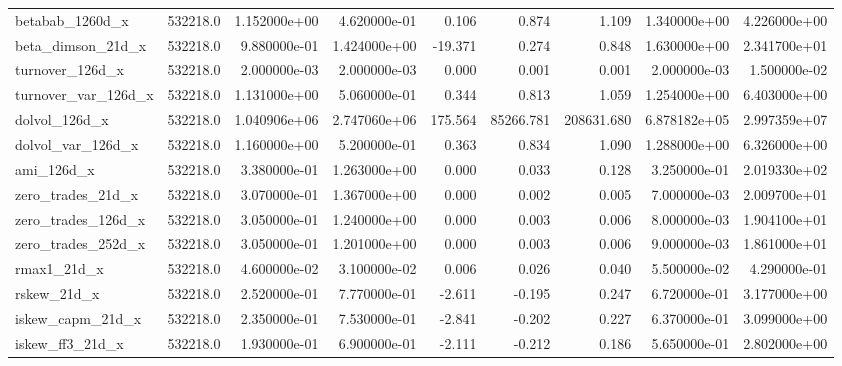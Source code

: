 \documentclass[12pt]{article}
\begin{document}
\begin{landscape}
\begin{longtable}{|l|r|r|r|r|r|r|r|r|}
betabab\_1260d\_x        &  532218.0 &  1.152000e+00 &  4.620000e-01 &       0.106 &        0.874 &        1.109 &  1.340000e+00 &  4.226000e+00 \\
beta\_dimson\_21d\_x      &  532218.0 &  9.880000e-01 &  1.424000e+00 &     -19.371 &        0.274 &        0.848 &  1.630000e+00 &  2.341700e+01 \\
turnover\_126d\_x        &  532218.0 &  2.000000e-03 &  2.000000e-03 &       0.000 &        0.001 &        0.001 &  2.000000e-03 &  1.500000e-02 \\
turnover\_var\_126d\_x    &  532218.0 &  1.131000e+00 &  5.060000e-01 &       0.344 &        0.813 &        1.059 &  1.254000e+00 &  6.403000e+00 \\
dolvol\_126d\_x          &  532218.0 &  1.040906e+06 &  2.747060e+06 &     175.564 &    85266.781 &   208631.680 &  6.878182e+05 &  2.997359e+07 \\
dolvol\_var\_126d\_x      &  532218.0 &  1.160000e+00 &  5.200000e-01 &       0.363 &        0.834 &        1.090 &  1.288000e+00 &  6.326000e+00 \\
ami\_126d\_x             &  532218.0 &  3.380000e-01 &  1.263000e+00 &       0.000 &        0.033 &        0.128 &  3.250000e-01 &  2.019330e+02 \\
zero\_trades\_21d\_x      &  532218.0 &  3.070000e-01 &  1.367000e+00 &       0.000 &        0.002 &        0.005 &  7.000000e-03 &  2.009700e+01 \\
zero\_trades\_126d\_x     &  532218.0 &  3.050000e-01 &  1.240000e+00 &       0.000 &        0.003 &        0.006 &  8.000000e-03 &  1.904100e+01 \\
zero\_trades\_252d\_x     &  532218.0 &  3.050000e-01 &  1.201000e+00 &       0.000 &        0.003 &        0.006 &  9.000000e-03 &  1.861000e+01 \\
rmax1\_21d\_x            &  532218.0 &  4.600000e-02 &  3.100000e-02 &       0.006 &        0.026 &        0.040 &  5.500000e-02 &  4.290000e-01 \\
rskew\_21d\_x            &  532218.0 &  2.520000e-01 &  7.770000e-01 &      -2.611 &       -0.195 &        0.247 &  6.720000e-01 &  3.177000e+00 \\
iskew\_capm\_21d\_x       &  532218.0 &  2.350000e-01 &  7.530000e-01 &      -2.841 &       -0.202 &        0.227 &  6.370000e-01 &  3.099000e+00 \\
iskew\_ff3\_21d\_x        &  532218.0 &  1.930000e-01 &  6.900000e-01 &      -2.111 &       -0.212 &        0.186 &  5.650000e-01 &  2.802000e+00 \\

\end{longtable}
\end{landscape}
\end{document}
